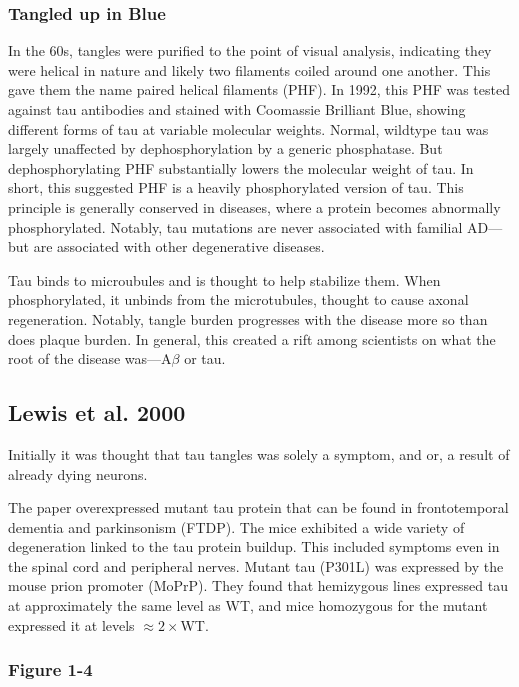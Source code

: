 \documentclass[12pt]{report}
\newcommand{\be}{\beta}
\begin{document}
\subsubsection*{Tangled up in Blue}

 In the 60s, tangles were purified to the point of visual analysis, indicating they were helical in nature and likely two filaments coiled around one another. This gave them the name paired helical filaments (PHF). In 1992, this PHF was tested against tau antibodies and stained with Coomassie Brilliant Blue, showing different forms of tau at variable molecular weights. Normal, wildtype tau was largely unaffected by dephosphorylation by a generic phosphatase. But dephosphorylating PHF substantially lowers the molecular weight of tau. In short, this suggested PHF is a heavily phosphorylated version of tau. This principle is generally conserved in diseases, where a protein becomes abnormally phosphorylated. Notably, tau mutations are never associated with familial AD---but are associated with other degenerative diseases.\newline

 Tau binds to microubules and is thought to help stabilize them. When phosphorylated, it unbinds from the microtubules, thought to cause axonal regeneration. Notably, tangle burden progresses with the disease more so than does plaque burden. In general, this created a rift among scientists on what the root of the disease was---A$\be$ or tau. 

 \subsection*{Lewis et al. 2000}

 Initially it was thought that tau tangles was solely a symptom, and or, a result of already dying neurons.\newline

 The paper overexpressed mutant tau protein that can be found in frontotemporal dementia and parkinsonism (FTDP). The mice exhibited a wide variety of degeneration linked to the tau protein buildup. This included symptoms even in the spinal cord and peripheral nerves. Mutant tau (P301L) was expressed by the mouse prion promoter (MoPrP). They found that hemizygous lines expressed tau at approximately the same level as WT, and mice homozygous for the mutant expressed it at levels $\approx 2\times$WT.  

 \subsubsection*{Figure 1-4}
\end{document}

